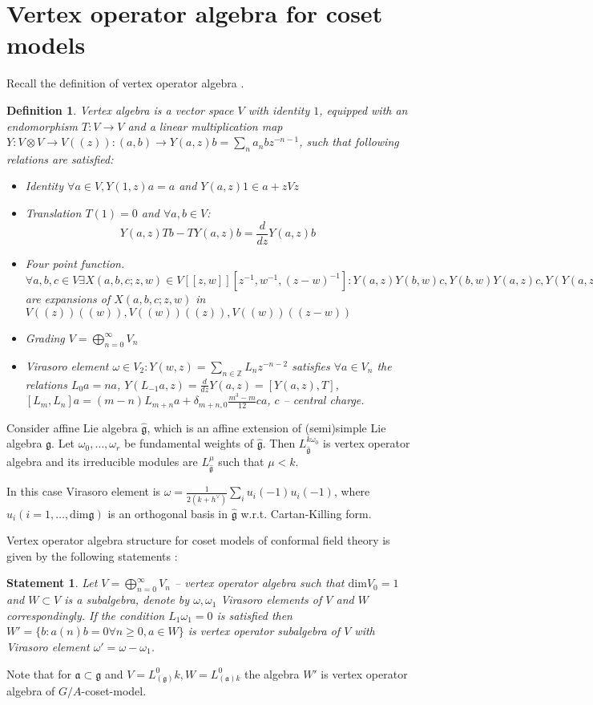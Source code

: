 \documentclass[12pt]{article}
\newtheorem{Def}{Definition}[section]
\newtheorem{statement}{Statement}
\newcommand{\gf}{\mathfrak{g}}
\newcommand{\af}{\mathfrak{a}}
\newcommand{\gfh}{\hat{\mathfrak{g}}}
\begin{document}
\section{Vertex operator algebra for coset models}
\label{sec:vert-oper-algebra}

Recall the definition of vertex operator algebra \cite{borcherds1986vertex,kac1998vertex,frenkel2001vertex,frenkel1988vertex}.
\begin{Def}
  Vertex algebra is a  vector space $V$ with identity $1$, equipped with an endomorphism
  $T:V\to V$ and a linear multiplication map $Y:V\otimes V\to V((z)):
  (a,b)\to Y(a,z)b=\sum_n a_n b z^{-n-1}$,
  such that following relations are satisfied:
  \begin{itemize}
  \item {\it Identity} $\forall a\in V, Y(1,z) a =a$ and $Y(a,z) 1 \in a+z V z$
  \item {\it Translation} $T(1)=0$ and $\forall a,b\in V$:
    $$Y(a,z)T b - T Y(a,z) b =
    \frac{d}{dz} Y(a,z) b$$
  \item {\it Four point function}. $\forall a,b,c\in V \exists
    X(a,b,c;z,w)\in V[[z,w]][z^{-1},w^{-1},(z-w)^{-1}]: Y(a,z)Y(b,w)c,
    Y(b,w)Y(a,z)c, Y(Y(a,z-w)b,w)c$ are expansions of $X(a,b,c;z,w)$
    in $V((z))((w)), V((w))((z)), V((w))((z-w))$
  \item {\it Grading} $V=\bigoplus_{n=0}^{\infty} V_n$
  \item {\it Virasoro element} $\omega\in V_2: Y(w,z)=\sum_{n\in
      \mathbb{Z}} L_n z^{-n-2}$ satisfies $\forall a\in V_n$ the
      relations $L_0 a =n a$,
      $Y(L_{-1}a,z)=\frac{d}{dz}Y(a,z)=[Y(a,z),T]$,
      $[L_m,L_n]a=(m-n)L_{m+n} a + \delta_{m+n,0} \frac{m^3 -
        m}{12}ca$, $c$ -- central charge.
  \end{itemize}

\end{Def}

Consider affine Lie algebra $\gfh$, which is an affine extension of (semi)simple Lie algebra $\gf$.
Let $\omega_{0},\dots,\omega_{r}$ be fundamental weights of $\gfh$. Then $L^{k\omega_{0}}_{\gfh}$ is vertex operator algebra and its irreducible modules are $L^{\mu}_{\gfh}$ such that $\mu<k$.

In this case Virasoro element is  $\omega=\frac{1}{2(k+h^{\vee})}\sum_i u_i(-1) u_i(-1)$, where
$u_i (i=1,\dots,\mathrm{dim}\gf)$  is an orthogonal basis in $\gfh$ w.r.t. Cartan-Killing form. 

Vertex operator algebra structure for coset models of conformal field theory is given by the following statements \cite{frenkel1992vertex}:
\begin{statement}
\label{thm:cosets}
Let  $V=\bigoplus_{n=0}^{\infty} V_n$ -- vertex operator algebra such that $\mathrm{dim}V_0=1$ and $W\subset V$ is a subalgebra, denote by $\omega,\omega_1$ Virasoro elements of  $V$ and $W$ correspondingly. If the condition  $L_1\omega_1 =0$ is satisfied then $W'=\{b:
  a(n)b=0 \forall n\geq 0, a\in W\}$ is vertex operator subalgebra of  $V$ with Virasoro element $\omega'=\omega-\omega_1$.
\end{statement}
Note that for $\af\subset\gf$ and $V=L^0_{(\gf)}k, W=L^0_{(\af)k}$ the algebra
$W'$ is vertex operator algebra of  $G/A$-coset-model. 
\end{document}
